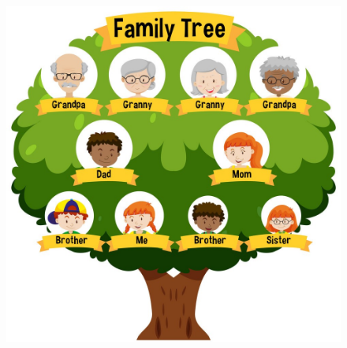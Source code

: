\begin{multicols}{2}
\begin{figure}[H]
		\includegraphics[width= 0.92\linewidth]{tree1}
	\end{figure}
	
	\vspace*{0.1pt}
	

\end{multicols}
